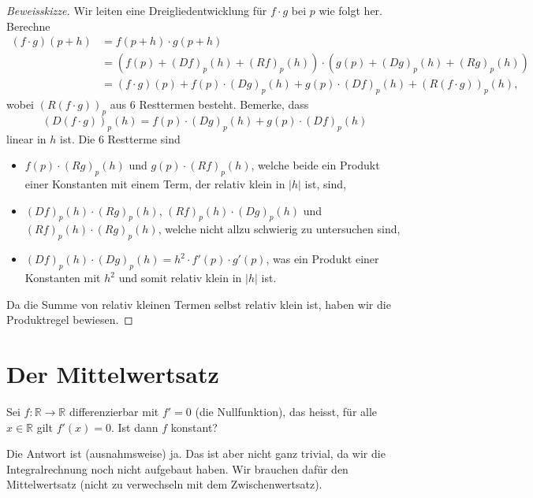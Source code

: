 \documentclass[../main.tex]{subfiles}
\begin{document}
\begin{proof}[Beweisskizze]
  Wir leiten eine Dreigliedentwicklung für $f \cdot g$ 
  bei $p$ wie folgt her. Berechne
  \begin{align*}
    (f \cdot g) (p+h)
    & = f(p+h) \cdot g(p+h)\\
    &= \left( f(p) + {(Df)}_p(h) + {(Rf)}_p(h) \right)
    \cdot \left( g(p) + {(Dg)}_p(h) + {(Rg)}_p(h) \right) \\
    &= (f \cdot g)(p)
    + f(p) \cdot {(Dg)}_p(h) + g(p) \cdot {(Df)}_p(h)
    + {(R(f \cdot g))}_p(h),
  \end{align*}
  wobei ${(R(f \cdot g))}_p$ aus $6$ Resttermen
  besteht.
  Bemerke, dass
  \[
    {(D(f \cdot g))}_p(h) = f(p) \cdot {(Dg)}_p(h)
    + g(p) \cdot {(Df)}_p(h)
  \]
  linear in $h$ ist.
  Die $6$ Restterme sind
  \begin{itemize}
    \item $f(p) \cdot {(Rg)}_p(h)$ und
      $g(p) \cdot {(Rf)}_p(h)$, welche beide
      ein Produkt einer Konstanten
      mit einem Term, der relativ klein in $|h|$ ist, sind, %
    \item ${(Df)}_p(h) \cdot {(Rg)}_p(h)$,
      ${(Rf)}_p(h) \cdot {(Dg)}_p(h)$ und
      ${(Rf)}_p(h) \cdot {(Rg)}_p(h)$,
      welche nicht allzu schwierig zu untersuchen sind,
    \item ${(Df)}_p(h) \cdot {(Dg)}_p(h) = h^2
      \cdot f'(p) \cdot g'(p)$, was ein Produkt
      einer Konstanten
      mit $h^2$ und somit relativ klein in $|h|$ ist.
  \end{itemize}
  Da die Summe von relativ kleinen Termen selbst relativ
  klein ist, haben wir die Produktregel bewiesen.
\end{proof}

\section{Der Mittelwertsatz}
\begin{question}
  Sei $f \colon \mathbb{R} \to \mathbb{R}$ 
  differenzierbar mit $f' = 0$ (die Nullfunktion),
  das heisst, für alle $x \in \mathbb{R}$ gilt
  $f'(x) = 0$. Ist dann $f$ konstant?
\end{question}

Die Antwort ist (ausnahmsweise) ja.
Das ist aber nicht ganz trivial, da wir
die Integralrechnung noch nicht aufgebaut haben.
Wir brauchen dafür den Mittelwertsatz
(nicht zu verwechseln mit dem Zwischenwertsatz).
\end{document}

